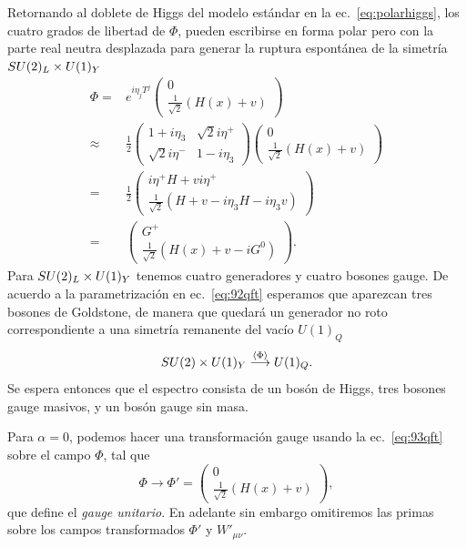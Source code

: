 \begin{frame}
Retornando al doblete de Higgs del modelo estándar en la ec.~\eqref{eq:polarhiggs}, los cuatro grados de libertad de $\Phi$, pueden escribirse en forma polar pero con la parte real neutra desplazada para generar la ruptura espontánea de la simetría $SU(2)_L\times  U(1)_Y$
\begin{align}
\label{eq:92qft}
  \Phi=&e^{i\eta_jT^j}
  \begin{pmatrix}
    0\\
    \frac{1}{\sqrt{2}}(H(x)+v)
  \end{pmatrix}\\
  \approx&
  \frac{1}{2}\begin{pmatrix}
    1+i\eta_3&\sqrt{2}i\eta^+\\
    \sqrt{2}i\eta^-&1-i\eta_3
  \end{pmatrix}  \begin{pmatrix}
    0\\
    \frac{1}{\sqrt{2}}(H(x)+v)
  \end{pmatrix}\nonumber\\
  =&\frac{1}{2}\begin{pmatrix}
    i\eta^+H+vi\eta^+\\
    \frac{1}{\sqrt{2}}(H+v-i\eta_3H-i\eta_3 v)
  \end{pmatrix}\nonumber\\
  =&\begin{pmatrix}
    G^+\\
    \frac{1}{\sqrt{2}}(H(x)+v-iG^0)
  \end{pmatrix}.\nonumber
\end{align}
Para $SU(2)_L\times  U(1)_Y$ tenemos cuatro generadores y cuatro bosones gauge. De acuerdo a la parametrización en ec.~\eqref{eq:92qft} esperamos que aparezcan tres bosones de Goldstone, de manera que quedará un generador no roto correspondiente a una simetría remanente del vacío $U(1)_Q$
\begin{equation}
  SU(2)\times  U(1)_Y\overset{\langle\Phi\rangle}{\longrightarrow}U(1)_Q.
\end{equation}
Se espera entonces que el espectro consista de un bosón de Higgs, tres bosones gauge masivos, y un bosón gauge sin masa.

Para $\alpha=0$, podemos hacer una transformación gauge usando la ec.~\eqref{eq:93qft} sobre el campo $\Phi$, tal que
\begin{equation}
  \label{eq:123qft}
    \Phi\to\Phi'=
  \begin{pmatrix}
    0\\
    \frac{1}{\sqrt{2}}(H(x)+v)
  \end{pmatrix},
\end{equation}
que define el \emph{gauge unitario}. En adelante sin embargo omitiremos las primas sobre los campos transformados $\Phi'$ y $W'_{\mu\nu}$.


\end{frame}
